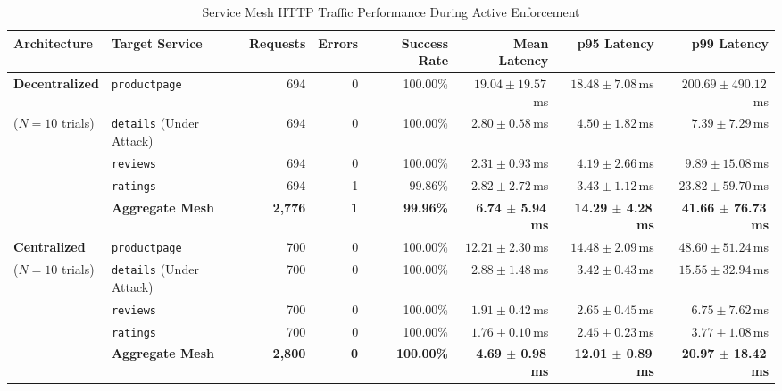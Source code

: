 \begin{table}[t]
\centering
\caption{Service Mesh HTTP Traffic Performance During Active Enforcement}
\label{tab:scenario1_traffic}
\small
\begin{tabular}{llrrrrrr}
\toprule
\textbf{Architecture} & \textbf{Target Service} & \textbf{Requests} & \textbf{Errors} & \textbf{Success Rate} & \textbf{Mean Latency} & \textbf{p95 Latency} & \textbf{p99 Latency} \\
\midrule
\textbf{Decentralized} & \texttt{productpage} & 694 & 0 & 100.00\% & $19.04 \pm 19.57$\,ms & $18.48 \pm 7.08$\,ms & $200.69 \pm 490.12$\,ms \\
($N=10$ trials) & \texttt{details} (Under Attack) & 694 & 0 & 100.00\% & $2.80 \pm 0.58$\,ms & $4.50 \pm 1.82$\,ms & $7.39 \pm 7.29$\,ms \\
& \texttt{reviews} & 694 & 0 & 100.00\% & $2.31 \pm 0.93$\,ms & $4.19 \pm 2.66$\,ms & $9.89 \pm 15.08$\,ms \\
& \texttt{ratings} & 694 & 1 & 99.86\% & $2.82 \pm 2.72$\,ms & $3.43 \pm 1.12$\,ms & $23.82 \pm 59.70$\,ms \\
\cmidrule{2-8}
& \textbf{Aggregate Mesh} & \textbf{2,776} & \textbf{1} & \textbf{99.96\%} & \textbf{6.74 $\pm$ 5.94\,ms} & \textbf{14.29 $\pm$ 4.28\,ms} & \textbf{41.66 $\pm$ 76.73\,ms} \\
\midrule
\textbf{Centralized} & \texttt{productpage} & 700 & 0 & 100.00\% & $12.21 \pm 2.30$\,ms & $14.48 \pm 2.09$\,ms & $48.60 \pm 51.24$\,ms \\
($N=10$ trials) & \texttt{details} (Under Attack) & 700 & 0 & 100.00\% & $2.88 \pm 1.48$\,ms & $3.42 \pm 0.43$\,ms & $15.55 \pm 32.94$\,ms \\
& \texttt{reviews} & 700 & 0 & 100.00\% & $1.91 \pm 0.42$\,ms & $2.65 \pm 0.45$\,ms & $6.75 \pm 7.62$\,ms \\
& \texttt{ratings} & 700 & 0 & 100.00\% & $1.76 \pm 0.10$\,ms & $2.45 \pm 0.23$\,ms & $3.77 \pm 1.08$\,ms \\
\cmidrule{2-8}
& \textbf{Aggregate Mesh} & \textbf{2,800} & \textbf{0} & \textbf{100.00\%} & \textbf{4.69 $\pm$ 0.98\,ms} & \textbf{12.01 $\pm$ 0.89\,ms} & \textbf{20.97 $\pm$ 18.42\,ms} \\
\bottomrule
\end{tabular}
\vspace{1ex}
\end{table}

